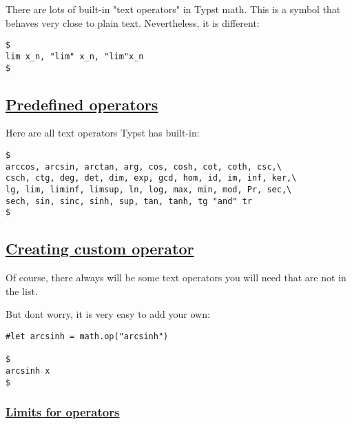 There are lots of built-in "text operators" in Typst math. This is a
symbol that behaves very close to plain text. Nevertheless, it is
different:

\begin{verbatim}
$
lim x_n, "lim" x_n, "lim"x_n
$
\end{verbatim}

\pandocbounded{}

\subsection{\texorpdfstring{\hyperref[predefined-operators]{Predefined
operators}}{Predefined operators}}\label{predefined-operators}

Here are all text operators Typst has built-in:

\begin{verbatim}
$
arccos, arcsin, arctan, arg, cos, cosh, cot, coth, csc,\
csch, ctg, deg, det, dim, exp, gcd, hom, id, im, inf, ker,\
lg, lim, liminf, limsup, ln, log, max, min, mod, Pr, sec,\
sech, sin, sinc, sinh, sup, tan, tanh, tg "and" tr
$
\end{verbatim}

\pandocbounded{}

\subsection{\texorpdfstring{\hyperref[creating-custom-operator]{Creating
custom
operator}}{Creating custom operator}}\label{creating-custom-operator}

Of course, there always will be some text operators you will need that
are not in the list.

But don\textquotesingle t worry, it is very easy to add your own:

\begin{verbatim}
#let arcsinh = math.op("arcsinh")

$
arcsinh x
$
\end{verbatim}

\pandocbounded{}

\subsubsection{\texorpdfstring{\hyperref[limits-for-operators]{Limits
for operators}}{Limits for operators}}\label{limits-for-operators}


